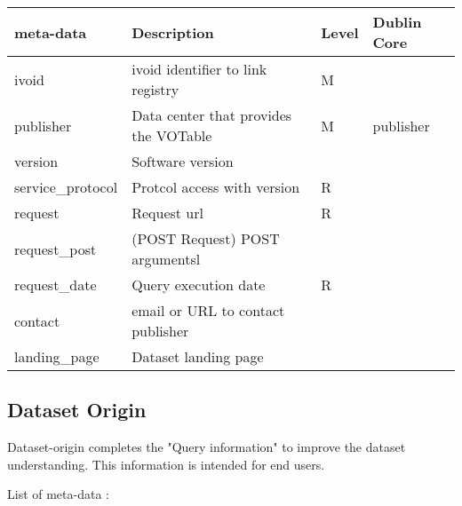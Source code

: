 \documentclass[11pt,a4paper]{ivoa}
\begin{document}
\begin{tabular}{|l|l|l|l|}  \hline
\textbf{meta-data} & \textbf{Description} & \textbf{Level} & \textbf{Dublin Core}\\ \hline
ivoid             & ivoid identifier to link registry & M &  \\ \hline
publisher         & Data center that provides the VOTable & M & publisher\\ \hline
version           & Software version  & & \\ \hline
service\_protocol & Protcol access with version & R& \\ \hline
request           & Request url &  R& \\ \hline 
request\_post     & (POST Request) POST argumentsl &  & \\ \hline 
request\_date     & Query execution date & R&\\ \hline	 
contact           & email or URL to contact publisher & & \\ \hline	 
landing\_page     & Dataset landing page & & \\ \hline
\end{tabular}


\subsection{Dataset Origin}
Dataset-origin completes the "Query information" to improve the dataset understanding. This information is intended for end users.

List of meta-data :\\
\end{document}
